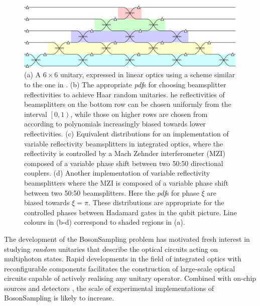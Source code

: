 \documentclass[aps,prl,twocolumn,floatfix]{revtex4}
\newcommand{\by}{\times}
\newcommand{\pdf}{{\it pdf}}
\newcommand{\bosonsampling}{\textsc BosonSampling}
\begin{document}
\begin{figure}[t]
  \includegraphics{figures/example}
  \caption{(a) A \(6 \by 6\) unitary, expressed in linear optics using a scheme
    similar to the one in \cite{re-prl-73-58}. (b) The appropriate \pdf{}s for
    choosing beamsplitter reflectivities to achieve Haar random unitaries.
    he reflectivities of beamsplitters on the
    bottom row can be chosen uniformly from the interval \(\left[ 0,1 \right)\),
    while those on higher rows are chosen from according to polynomials
    increasingly biased towards lower reflectivities. (c) Equivalent
    distributions for an implementation of variable reflectivity beamsplitters
    in integrated optics, where the reflectivity is controlled by a Mach Zehnder
    interferometer (MZI) composed of a variable phase shift between two 50:50
    directional couplers. (d) Another implementation of variable reflectivity
    beamsplitters where the MZI is composed of a variable phase shift between
    two 50:50 beamsplitters. Here the \pdf{}s for phase \(\xi\) are biased
    towards \(\xi=\pi\). These distributions are appropriate for the controlled
    phases between Hadamard gates in the qubit picture. Line colours in (b-d)
    correspond to shaded regions in (a).}
  \label{fig:example}
\end{figure}

The development of the \bosonsampling{} problem \cite{aa-conf-11-333} has
motivated fresh interest in studying \emph{random} unitaries that describe the
optical circuits acting on multiphoton states. Rapid developments in the field
of integrated optics with reconfigurable components facilitates the construction
of large-scale optical circuits capable of actively realising any unitary
operator. Combined with on-chip sources \cite{si-nphoton-8-104}
and detectors \cite{re-srep-3, pe-ncomm-3-1325}, the scale of experimental
implementations of \bosonsampling{} \cite{cr-nat-7-545, br-sci-339-794,
sp-sci-339-798, ti-nphoton-7-540} is likely to increase.
\end{document}
